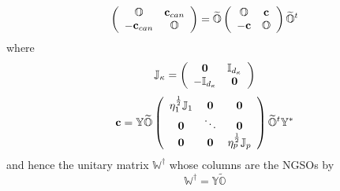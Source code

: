 \documentclass[aps,preprint]{revtex4}%
\begin{document}
\[
\left(
\begin{array}
[c]{cc}%
\mathbb{O} & \mathbf{c}_{can}\\
-\mathbf{c}_{can} & \mathbb{O}%
\end{array}
\right)  =\widetilde{\mathbb{O}}\left(
\begin{array}
[c]{cc}%
\mathbb{O} & \mathbf{c}\\
-\mathbf{c} & \mathbb{O}%
\end{array}
\right)  \widetilde{\mathbb{O}}^{t}%
\]
where
\[
\mathbb{J}_{\kappa}=\left(
\begin{array}
[c]{cc}%
\mathbf{0} & \mathbb{I}_{d_{\kappa}}\\
-\mathbb{I}_{d_{\kappa}} & \mathbf{0}%
\end{array}
\right)
\]%
\begin{equation}
\mathbf{c}=\mathbb{Y}\widetilde{\mathbb{O}}\left(
\begin{array}
[c]{ccc}%
\eta_{1}^{\frac{1}{2}}\mathbb{J}_{1} & \mathbf{0} & \mathbf{0}\\
\mathbf{0} & \ddots & \mathbf{0}\\
\mathbf{0} & \mathbf{0} & \eta_{p}^{\frac{1}{2}}\mathbb{J}_{p}%
\end{array}
\right)  \widetilde{\mathbb{O}}^{t}\mathbb{Y}^{\ast}%
\end{equation}
and hence the unitary matrix $\mathbb{W}^{\dagger}$ whose columns are the
NGSOs by
\begin{equation}
\mathbb{W}^{\dagger}=\mathbb{Y}\widetilde{\mathbb{O}}%
\end{equation}%
\end{document}
